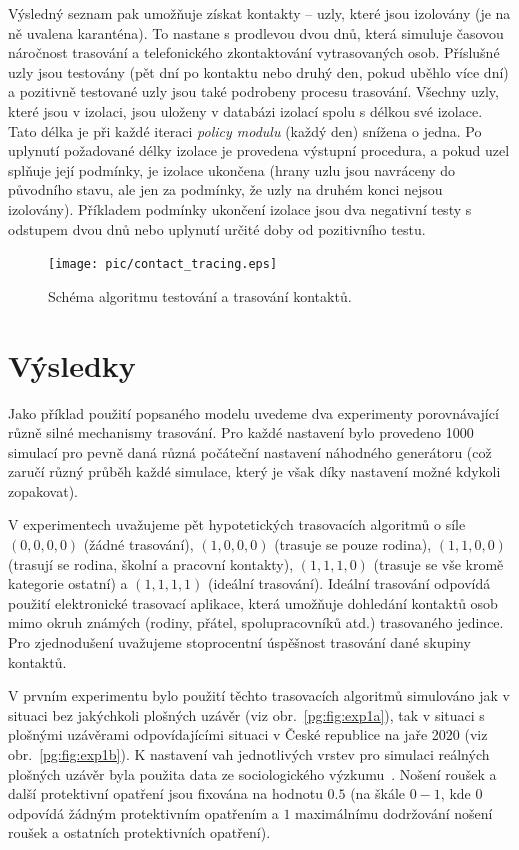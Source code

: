 Výsledný seznam pak umožňuje získat kontakty -- uzly, které jsou izolovány (je na
ně uvalena karanténa). To nastane s prodlevou dvou dnů, která simuluje časovou
náročnost trasování a telefonického zkontaktování vytrasovaných osob.
Příslušné uzly jsou testovány (pět dní po kontaktu nebo druhý den, pokud uběhlo
více dní) a pozitivně testované uzly jsou také podrobeny procesu trasování. 
Všechny uzly, které jsou v izolaci, jsou uloženy v databázi izolací spolu s délkou
své izolace. Tato délka je při každé iteraci {\em policy modulu} (každý den)
snížena o jedna. Po uplynutí požadované délky izolace je provedena výstupní
procedura, a pokud uzel splňuje její podmínky, je izolace ukončena (hrany uzlu
jsou navráceny do původního stavu, ale jen za podmínky, že uzly na druhém konci
nejsou izolovány). Příkladem podmínky ukončení izolace jsou dva negativní testy s
odstupem dvou dnů nebo uplynutí určité doby od pozitivního testu.


\begin{figure}
  \centering \texttt{[image: pic/contact\_tracing.eps]}
  \caption{Schéma algoritmu testování a trasování kontaktů.}
  \label{pg:fig:ct}
\end{figure}




\section*{Výsledky}
Jako příklad použití popsaného modelu uvedeme dva experimenty porovnávající
různě silné mechanismy trasování. Pro každé nastavení bylo provedeno 1000
simulací pro pevně daná různá počáteční nastavení náhodného
generátoru (což zaručí různý průběh každé simulace, který je však díky nastavení možné kdykoli zopakovat).

V experimentech uvažujeme pět hypotetických trasovacích algoritmů o
síle $(0, 0, 0, 0)$ (žádné trasování), $(1, 0, 0, 0)$ (trasuje se
pouze rodina), $(1, 1, 0, 0)$ (trasují se rodina, školní a pracovní
kontakty), $(1, 1, 1, 0)$ (trasuje se vše kromě kategorie ostatní) a
$(1, 1, 1, 1)$ (ideální trasování). Ideální trasování odpovídá použití
elektronické trasovací aplikace, která umožňuje dohledání kontaktů
osob mimo okruh známých (rodiny, přátel, spolupracovníků atd.) trasovaného jedince. Pro zjednodušení
uvažujeme stoprocentní úspěšnost trasování dané skupiny kontaktů.

V prvním experimentu bylo použití těchto trasovacích algoritmů
simulováno jak v situaci bez jakýchkoli plošných uzávěr (viz
obr.~\ref{pg:fig:exp1a}), tak v situaci s plošnými uzávěrami
odpovídajícími situaci v České republice na jaře 2020 (viz
obr.~\ref{pg:fig:exp1b}). K nastavení vah jednotlivých vrstev pro
simulaci reálných plošných uzávěr byla použita data ze sociologického
výzkumu~\cite{pg:paqcovid}. Nošení roušek a další protektivní opatření
jsou fixována na hodnotu $0.5$ (na škále $0 - 1$, kde $0$ odpovídá
žádným protektivním opatřením a $1$ maximálnímu dodržování nošení
roušek a ostatních protektivních opatření).

